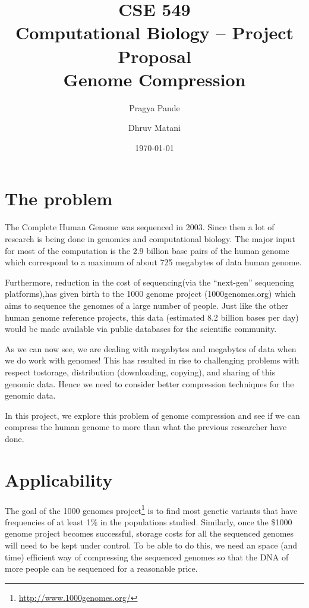 \documentclass[11pt,twocolumn]{article}
\begin{document}
\title{CSE 549\\Computational Biology -- Project Proposal\\Genome Compression}
\author{Pragya Pande \and Dhruv Matani}
\date{\today}

\maketitle

\vspace{0.5in}

\section*{The problem}
The Complete Human Genome was sequenced in 2003. Since then a lot of
research is being done in genomics and computational biology. The
major input for most of the computation is the 2.9 billion base pairs
\cite{2}\cite{3} of the human genome which correspond to a maximum of about 
725 megabytes of data human genome.\cite{4}

Furthermore, reduction in the cost of sequencing(via the “next-gen” 
sequencing platforms),has given birth to the 1000 genome project
(1000genomes.org) which aims to sequence the genomes of a large 
number of people. Just like the other human genome reference projects,
this data (estimated 8.2 billion bases per day) would be made
available via public databases for the scientific community.\cite{5}

As we can now see, we are dealing with megabytes and megabytes of data 
when we do work with genomes! This has resulted in rise to challenging 
problems with respect tostorage, distribution (downloading, copying), 
and sharing of this genomic data. Hence we need to consider better 
compression techniques for the genomic data.

In this project, we explore this problem of genome compression and see
if we can compress the human genome to more than what the previous
researcher have done.\cite{6}

\section*{Applicability}

The goal of the 1000 genomes project\footnote{\url{http://www.1000genomes.org/}}
is to find most genetic variants that have frequencies of at least 1\%
in the populations studied. Similarly, once the \$1000 genome
project\cite{1000genomeproject} becomes successful, storage costs for
all the sequenced genomes will need to be kept under control. To be
able to do this, we need an space (and time) efficient way of
compressing the sequenced genomes so that the DNA of more people can
be sequenced for a reasonable price.
\end{document}
